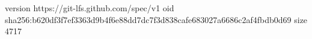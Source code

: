 version https://git-lfs.github.com/spec/v1
oid sha256:b620df3f7ef3363d9b4f6e88dd7dc7f3d838cafe683027a6686c2af4fbdb0d69
size 4717
